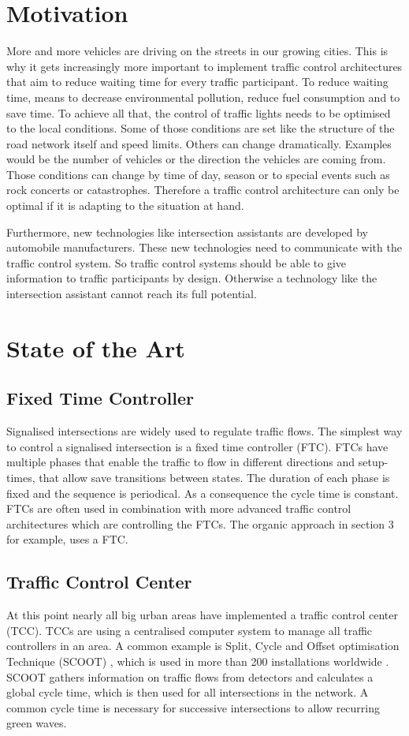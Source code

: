 \section{Motivation}
More and more vehicles are driving on the streets in our growing cities. This is why it gets increasingly more important to implement traffic control architectures that aim to reduce waiting time for every traffic participant. To reduce waiting time, means to decrease environmental pollution, reduce fuel consumption and to save time. To achieve all that, the control of traffic lights needs to be optimised to the local conditions. Some of those conditions are set like the structure of the road network itself and speed limits. Others can change dramatically. Examples would be the number of vehicles or the direction the vehicles are coming from. Those conditions can change by time of day, season or to special events such as rock concerts or catastrophes. Therefore a traffic control architecture can only be optimal if it is adapting to the situation at hand.

Furthermore, new technologies like intersection assistants are developed by automobile manufacturers. These new technologies need to communicate with the traffic control system. So traffic control systems should be able to give information to traffic participants by design. Otherwise a technology like the intersection assistant cannot reach its full potential.


\section{State of the Art}


\subsection{Fixed Time Controller}
Signalised intersections are widely used to regulate traffic flows. The simplest way to control a signalised intersection is a fixed time controller (FTC). FTCs have multiple phases that enable the traffic to flow in different directions and setup-times, that allow save transitions between states. The duration of each phase is fixed and the sequence is periodical. As a consequence the cycle time is constant. FTCs are often used in combination with more advanced traffic control architectures which are controlling the FTCs. The organic approach in section 3 for example, uses a FTC.

\subsection{Traffic Control Center}
At this point nearly all big urban areas have implemented a traffic control center (TCC). TCCs are using a centralised computer system to manage all traffic controllers in an area. A common example is Split, Cycle and Offset optimisation Technique (SCOOT) \cite{scoot}, which is used in more than 200 installations worldwide \cite{organic1}. SCOOT gathers information on traffic flows from detectors and calculates a global cycle time, which is then used for all intersections in the network. A common cycle time is necessary for successive intersections to allow recurring green waves. 

